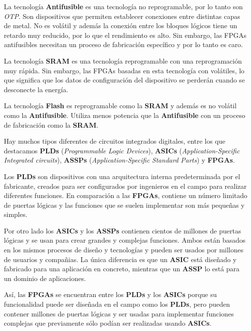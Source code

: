 La tecnología \textbf{Antifusible} es una tecnología no reprogramable, por lo tanto son \textit{OTP}. Son dispositivos que permiten establecer 
conexiones entre distintas capas de metal. No es volátil y además la conexión entre los bloques lógicos tiene un retardo muy reducido, por lo 
que el rendimiento es alto. Sin embargo, las FPGAs antifusibles necesitan un proceso de fabricación específico y por lo tanto es caro. 

La tecnología \textbf{SRAM} es una tecnología reprogramable con una reprogramación muy rápida. Sin embargo, las FPGAs basadas en esta tecnología 
con volátiles, lo que significa que los datos de configuración del dispositivo se perderán cuando se desconecte la energía. 

La tecnología \textbf{Flash} es reprogramable como la \textbf{SRAM} y además es no volátil como la \textbf{Antifusible}. Utiliza menos potencia 
que la \textbf{Antifusible} con un proceso de fabricación como la \textbf{SRAM}.

Hay muchos tipos diferentes de circuitos integrados digitales, entre los que destacamos \textbf{PLDs} (\textit{Programmable Logic Devices}), 
\textbf{ASICs} (\textit{Application-Specific Integrated circuits}), \textbf{ASSPs} (\textit{Application-Specific Standard Parts}) y \textbf{FPGAs}.

Los \textbf{PLDs} son dispositivos con una arquitectura interna predeterminada por el fabricante, creados para ser configurados por 
ingenieros en el campo para realizar diferentes funciones. En comparación a las \textbf{FPGAs}, contiene un número limitado de puertas lógicas 
y las funciones que se suelen implementar son más pequeñas y simples.

Por otro lado los \textbf{ASICs} y los \textbf{ASSPs} contienen cientos de millones de puertas lógicas y se usan para crear grandes y complejas 
funciones. Ambos están basados en los mismos procesos de diseño y tecnologías y pueden ser usados por millones de usuarios y compañias. La 
única diferencia es que un \textbf{ASIC} está diseñado y fabricado para una aplicación en concreto, mientras que un \textbf{ASSP} lo está 
para un dominio de aplicaciones.

Así, las \textbf{FPGAs} se encuentran entre los \textbf{PLDs} y los \textbf{ASICs} porque su funcionalidad puede ser diseñada en el campo como 
los \textbf{PLDs}, pero pueden contener millones de puertas lógicas y ser usadas para implementar funciones complejas que previamente sólo 
podían ser realizadas usando \textbf{ASICs}. 

